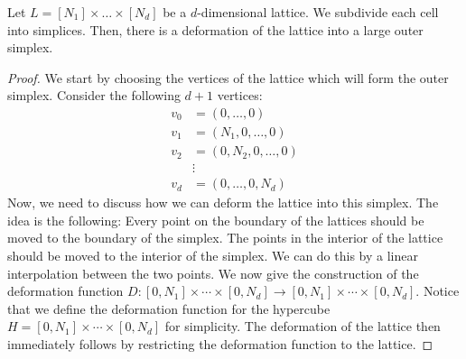 \begin{lemma}
	\label{lem:simplicial_deformation}
	Let $L = [N_1] \times \dots \times [N_d]$ be a $d$-dimensional lattice. We subdivide each cell into simplices. Then, there is a deformation of the lattice into a large outer simplex.
\end{lemma}
\begin{proof}
	We start by choosing the vertices of the lattice which will form the outer simplex. Consider the following $d+1$ vertices:
	\begin{align*}
		v_0 & = (0, \dots, 0)         \\
		v_1 & = (N_1, 0, \dots, 0)    \\
		v_2 & = (0, N_2, 0, \dots, 0) \\
		    & \vdots                  \\
		v_d & = (0, \dots, 0, N_d)
	\end{align*}
	Now, we need to discuss how we can deform the lattice into this simplex. The idea is the following: Every point on the boundary of the lattices should be moved to the boundary of the simplex. The points in the interior of the lattice should be moved to the interior of the simplex. We can do this by a linear interpolation between the two points. We now give the construction of the deformation function $D : [0, N_1] \times \cdots \times [0, N_d] \rightarrow [0, N_1] \times \cdots \times [0, N_d]$. Notice that we define the deformation function for the hypercube $H = [0, N_1] \times \cdots \times [0, N_d]$ for simplicity. The deformation of the lattice then immediately follows by restricting the deformation function to the lattice.


\end{proof}
